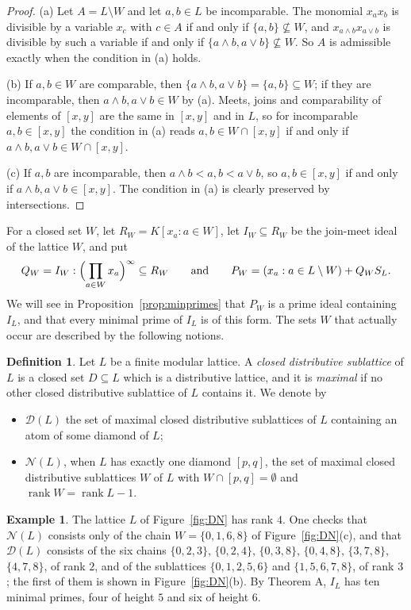 \documentclass{amsart}
\theoremstyle{definition}
\newtheorem{definition}[theorem]{Definition}
\newtheorem{example}[theorem]{Example}
\DeclareMathOperator{\rk}{rank}
\newcommand{\cD}{\mathcal D}
\newcommand{\cN}{\mathcal N}
\begin{document}
\begin{proof}
	(a) Let $A=L\setminus W$ and let $a,b\in L$ be incomparable. The monomial $x_ax_b$ is divisible by a variable $x_c$ with $c\in A$ if and only if $\{a,b\}\not\subseteq W$, and $x_{a\wedge b}x_{a\vee b}$ is divisible by such a variable if and only if $\{a\wedge b,a\vee b\}\not\subseteq W$. So $A$ is admissible exactly when the condition in (a) holds.
	
	(b) If $a,b\in W$ are comparable, then $\{a\wedge b,a\vee b\}=\{a,b\}\subseteq W$; if they are incomparable, then $a\wedge b,a\vee b\in W$ by (a). Meets, joins and comparability of elements of $[x,y]$ are the same in $[x,y]$ and in $L$, so for incomparable $a,b\in[x,y]$ the condition in (a) reads $a,b\in W\cap[x,y]$ if and only if $a\wedge b,a\vee b\in W\cap[x,y]$.
	
	(c) If $a,b$ are incomparable, then $a\wedge b<a,b<a\vee b$, so $a,b\in[x,y]$ if and only if $a\wedge b,a\vee b\in[x,y]$. The condition in (a) is clearly preserved by intersections.
\end{proof}
For a closed set $W$, let $R_W=K[x_a:a\in W]$, let $I_W\subseteq R_W$ be the join-meet ideal of the lattice $W$, and put
\[
Q_W=I_W:\Bigl(\prod_{a\in W}x_a\Bigr)^\infty\subseteq R_W\qquad\text{and}\qquad P_W=(x_a:a\in L\setminus W)+Q_WS_L.
\]
We will see in Proposition~\ref{prop:minprimes} that $P_W$ is a prime ideal containing $I_L$, and that every minimal prime of $I_L$ is of this form. The sets $W$ that actually occur are described by the following notions.

\begin{definition}\label{def:DN}
	Let $L$ be a finite modular lattice. A \emph{closed distributive sublattice} of $L$ is a closed set $D\subseteq L$ which is a distributive lattice, and it is \emph{maximal} if no other closed distributive sublattice of $L$ contains it. We denote by
	\begin{itemize}
		\item $\cD(L)$ the set of maximal closed distributive sublattices of $L$ containing an atom of some diamond of $L$;
		\item $\cN(L)$, when $L$ has exactly one diamond $[p,q]$, the set of maximal closed distributive sublattices $W$ of $L$ with $W\cap[p,q]=\emptyset$ and $\rk W=\rk L-1$.
	\end{itemize}
\end{definition}

\begin{example}\label{ex:DN}
	The lattice $L$ of Figure~\ref{fig:DN} has rank $4$. One checks that $\cN(L)$ consists only of the chain $W=\{0,1,6,8\}$ of Figure~\ref{fig:DN}(c), and that $\cD(L)$ consists of the six chains $\{0,2,3\}$, $\{0,2,4\}$, $\{0,3,8\}$, $\{0,4,8\}$, $\{3,7,8\}$, $\{4,7,8\}$, of rank $2$, and of the sublattices $\{0,1,2,5,6\}$ and $\{1,5,6,7,8\}$, of rank $3$; the first of them is shown in Figure~\ref{fig:DN}(b). By Theorem A, $I_L$ has ten minimal primes, four of height $5$ and six of height $6$.
\end{example}
\end{document}
